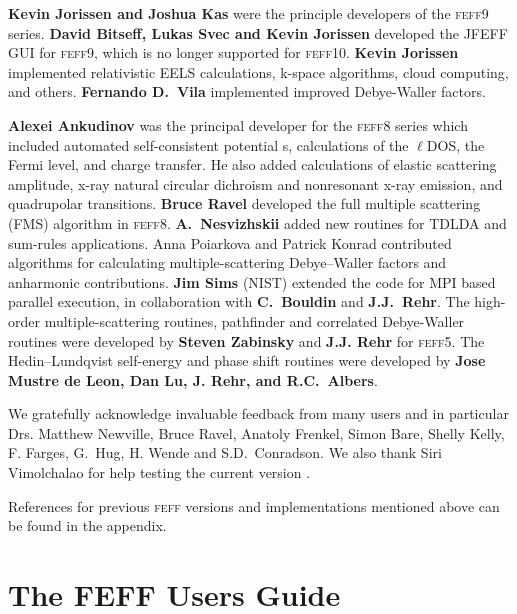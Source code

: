 \documentclass[11pt,oneside]{report} %
\newcommand{\feffcurrent}{\textsc{feff10}}
\renewcommand{\htmlref}[2]{\hyperlink{#2}{#1}}
\newcommand{\program}[1]{\textsc{#1}}
\newcommand{\feff}{\program{feff}}
\renewcommand{\htmlref}[2]{{#1}} %
\begin{document}
\begin{latexonly}
{\bf Kevin Jorissen and Joshua Kas} were the principle developers
of the {\feff}9 series.
{\bf David Bitseff, Lukas Svec and Kevin Jorissen} developed the JFEFF
GUI for {\feff}9, which is no longer supported for {\feffcurrent}.
{\bf Kevin Jorissen} implemented relativistic EELS calculations,
k-space algorithms, cloud computing, and others.
{\bf Fernando D.\ Vila} implemented improved Debye-Waller factors.

{\bf Alexei Ankudinov} was the principal developer for
the {\feff}8 series which included automated self-consistent potential
s, calculations of the $\ell$DOS, the Fermi level, and charge transfer.
He also added calculations of elastic scattering
amplitude, x-ray natural circular dichroism and nonresonant x-ray
emission, and quadrupolar transitions.  {\bf Bruce Ravel} developed the full
multiple scattering (FMS) algorithm in {\feff}8. 
{\bf A.\ Nesvizhskii} added new routines for TDLDA and sum-rules
applications. Anna Poiarkova and Patrick Konrad
contributed algorithms for calculating multiple-scattering Debye--Waller
factors and anharmonic contributions. {\bf Jim Sims} (NIST) extended
the code for
MPI based parallel execution, in collaboration with {\bf C.\ Bouldin} and
{\bf J.J.\ Rehr}.  The high-order multiple-scattering routines, pathfinder and
correlated Debye-Waller routines were developed by {\bf Steven Zabinsky} and
{\bf J.J. Rehr} for {\feff}5.
The Hedin--Lundqvist self-energy and phase shift routines were developed
by {\bf Jose Mustre de Leon, Dan Lu, J. Rehr, and R.C.~Albers}.

We gratefully acknowledge invaluable feedback from
many users and in particular Drs. Matthew Newville, Bruce Ravel, Anatoly
Frenkel, Simon Bare, Shelly Kelly, F. Farges, G.\ Hug, H. Wende
and S.D.\ Conradson.  We also thank Siri Vimolchalao for help testing
the current version {\feffcur}. 

References for previous {\feff} versions and implementations mentioned above can be found in the appendix.


\newpage
\section{The FEFF Users Guide}
\label{sec:UG}

%


\end{latexonly}
\end{document}
